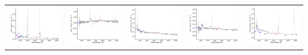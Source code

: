 \begin{center}
\begin{longtable}{l l l l l }
    \includegraphics[width=0.19\linewidth, clip]{Figs/Figs-sdss/spec-9150-58043-0660-STRIPE82-0143-028004.pdf} & \includegraphics[width=0.19\linewidth, clip]{Figs/Figs-sdss/spec-9151-58067-0073-STRIPE82-0147-026690.pdf} & \includegraphics[width=0.19\linewidth, clip]{Figs/Figs-sdss/spec-9152-58041-0463-STRIPE82-0147-005730.pdf} & \includegraphics[width=0.19\linewidth, clip]{Figs/Figs-sdss/spec-9163-58043-0013-STRIPE82-0122-036068.pdf} & \includegraphics[width=0.19\linewidth, clip]{Figs/Figs-sdss/spec-9163-58043-0152-STRIPE82-0122-053411.pdf} \\

\end{longtable}
\end{center}
